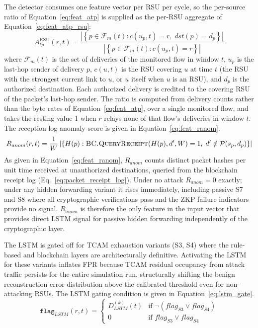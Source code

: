 \documentclass[12pt, a4paper]{report}
\begin{document}
The detector consumes one feature vector per \ac{RSU} per
cycle, so the per-source ratio of Equation~\eqref{eq:feat_atp}
is supplied as the per-\ac{RSU} aggregate of
Equation~\eqref{eq:feat_atp_rsu}:
\begin{equation}
A_{tp}^{\mathrm{RSU}}(r,t) =
\frac{\left|\left\{p \in \mathcal{F}_m(t) : c(u_p,t)=r,\; dst(p)=d_p\right\}\right|}
{\left|\left\{p \in \mathcal{F}_m(t) : c(u_p,t)=r\right\}\right|}
\label{eq:feat_atp_rsu}
\end{equation}
where $\mathcal{F}_m(t)$ is the set of deliveries of the
monitored flow in window $t$, $u_p$ is the last-hop sender of
delivery $p$, $c(u,t)$ is the \ac{RSU} covering $u$ at time $t$
(the \ac{RSU} with the strongest current link to $u$, or $u$
itself when $u$ is an \ac{RSU}), and $d_p$ is the authorized
destination. Each authorized delivery is credited to the
covering \ac{RSU} of the packet's last-hop sender. The ratio is
computed from delivery counts rather than the byte rates of
Equation~\eqref{eq:feat_atp}, over a single monitored flow, and
takes the resting value 1 when $r$ relays none of that flow's
deliveries in window $t$. The reception log anomaly
score is given in Equation~\eqref{eq:feat_ranom}.
\begin{equation}
R_{anom}(r,t) =
\frac{1}{W}\left|\left\{
H(p) :
\textsc{BC.QueryReceipt}(H(p),d',W) = 1,\;
d' \notin \mathcal{P}(s_p, d_p)
\right\}\right|
\label{eq:feat_ranom}
\end{equation}
As given in Equation~\eqref{eq:feat_ranom},
$R_{anom}$ counts distinct packet hashes per unit
time received at unauthorized destinations, queried
from the blockchain receipt log
(Eq.~\ref{eq:packet_receipt_log}). Under no attack
$R_{anom}{=}0$ exactly; under any hidden forwarding
variant it rises immediately, including passive S7
and S8 where all cryptographic verifications pass
and the \ac{ZKP} failure indicators provide no
signal. $R_{anom}$ is therefore the only feature in
the input vector that provides direct LSTM signal
for passive hidden forwarding independently of the
cryptographic layer.

The \ac{LSTM} is gated off for \ac{TCAM} exhaustion
variants (S3, S4) where the rule-based and blockchain
layers are architecturally definitive. Activating the
\ac{LSTM} for these variants inflates \ac{FPR} because
\ac{TCAM} residual occupancy from attack traffic
persists for the entire simulation run, structurally
shifting the benign reconstruction error distribution
above the calibrated threshold even for non-attacking
\ac{RSU}s. The \ac{LSTM} gating condition is given in
Equation~\eqref{eq:lstm_gate}.
\begin{equation}
\texttt{flag}_{LSTM}(r,t) =
\begin{cases}
D_{LSTM}^{(k)}(t) &
\text{if } \neg(flag_{S3} \lor flag_{S4}) \\
0 &
\text{if } flag_{S3} \lor flag_{S4}
\end{cases}
\label{eq:lstm_gate}
\end{equation}
\end{document}
